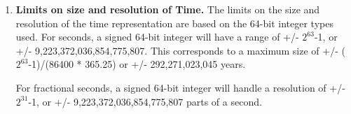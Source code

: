 
\begin{enumerate}

\item {\bf Limits on size and resolution of Time.}  The limits on the size and 
resolution of the time representation are based on the
64-bit integer types used.  For seconds, a signed 64-bit integer
will have a range of +/- $2^{63}$-1, or +/- 9,223,372,036,854,775,807.  This
corresponds to a maximum size of +/- ($2^{63}$-1)/(86400 * 365.25) or
+/- 292,271,023,045 years.

For fractional seconds, a signed 64-bit integer will handle a resolution of
+/- $2^{31}$-1, or +/- 9,223,372,036,854,775,807 parts of a second.

\end{enumerate}
